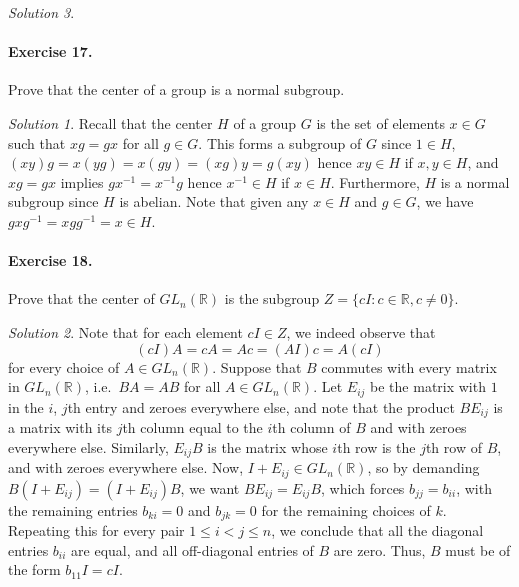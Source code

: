 \documentclass[11pt]{report}
\def\R{\mathbb{R}}
\theoremstyle{remark}
\newtheorem*{solution}{Solution}
\begin{document}
\begin{solution}
    \paragraph{Exercise 17.} Prove that the center of a group is a normal subgroup.
    \begin{solution}
        Recall that the center $H$ of a group $G$ is the set of elements $x \in G$
        such that $xg = gx$ for all $g \in G$. This forms a subgroup of $G$ since $1
        \in H$, $(xy)g = x(yg) = x(gy) = (xg)y = g(xy)$ hence $xy \in H$ if $x, y
        \in H$, and $xg = gx$ implies $gx^{-1} = x^{-1}g$ hence $x^{-1}\in H$ if $x
        \in H$. Furthermore, $H$ is a normal subgroup since $H$ is abelian. Note
        that given any $x \in H$ and $g \in G$, we have $gxg^{-1} = xgg^{-1} = x \in
        H$.
    \end{solution}
    
    \paragraph{Exercise 18.} Prove that the center of $GL_n(\R)$ is the subgroup $Z
    = \{cI\colon c \in \R, c \neq 0\}$.
    \begin{solution}
        Note that for each element $cI \in Z$, we indeed observe that \[
            (cI)A = cA = Ac = (AI)c = A(cI)
        \] for every choice of $A \in GL_n(\R)$.
        Suppose that $B$ commutes with every matrix in $GL_n(\R)$, i.e.\ $BA = AB$
        for all $A \in GL_n(\R)$. Let $E_{ij}$ be the matrix with $1$ in the $i$,
        $j$th entry and zeroes everywhere else, and note that the product $BE_{ij}$
        is a matrix with its $j$th column equal to the $i$th column of $B$ and with
        zeroes everywhere else. Similarly, $E_{ij}B$ is the matrix whose $i$th row
        is the $j$th row of $B$, and with zeroes everywhere else. Now, $I + E_{ij}
        \in GL_n(\R)$, so by demanding $B(I + E_{ij}) = (I + E_{ij})B$, we want
        $BE_{ij} = E_{ij}B$, which forces $b_{jj} = b_{ii}$, with the remaining
        entries $b_{ki} = 0$ and $b_{jk} = 0$ for the remaining choices of $k$.
        Repeating this for every pair $1 \leq i < j \leq n$, we conclude that all
        the diagonal entries $b_{ii}$ are equal, and all off-diagonal entries of $B$
        are zero. Thus, $B$ must be of the form $b_{11}I = cI$.
    \end{solution}


\end{solution}
\end{document}
